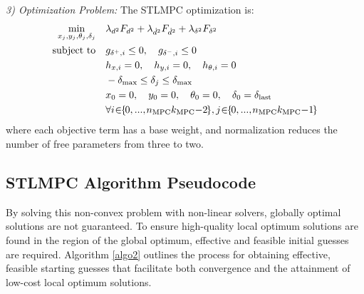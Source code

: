 \documentclass[journal]{IEEEtran}
\begin{document}
\indent \textit{3) Optimization Problem:} The STLMPC optimization is:
\begin{equation}
\begin{aligned}
\min_{x_j,y_j,\theta_j,\delta_j} \quad & \lambda_{d^2}F_{d^2}+\lambda_{\dot d^2}F_{\dot d^2}+\lambda_{\delta^2}F_{\delta^2} \\
\text{subject to} \quad & g_{\delta^+,i}\leq0,\quad g_{\delta^-,i}\leq0 \\
                        & h_{x,i}=0, \quad h_{y,i}=0,\quad h_{\theta,i}=0\\
                        & -\delta_\text{max}\leq\delta_j\leq\delta_\text{max}\\
                        & x_0=0,\quad y_0=0,\quad \theta_0=0,\quad \delta_0=\delta_\text{last}\\
                        & \forall i\!\mkern-1mu\in\!\! \{\mkern-2mu0,...,\mkern-1.5mun_\textup{MPC}k_\textup{MPC}\mkern-1mu\!-\!\mkern-1mu2\mkern-2mu\},j\!\mkern-1mu\in\!\! \{\mkern-2mu0,...,\mkern-1.5mun_\textup{MPC}k_\textup{MPC}\mkern-1mu\!-\!\mkern-1mu1\mkern-2mu\}
\end{aligned}
\label{STLMPC}
\end{equation}
where each objective term has a base weight, and normalization reduces the number of free parameters from three to two.

\subsection{STLMPC Algorithm Pseudocode}\label{sec3C}
By solving this non-convex problem with non-linear solvers, globally optimal solutions are not guaranteed. To ensure high-quality local optimum solutions are found in the region of the global optimum, effective and feasible initial guesses are required. Algorithm \ref{algo2} outlines the process for obtaining effective, feasible starting guesses that facilitate both convergence and the attainment of low-cost local optimum solutions.
\end{document}
